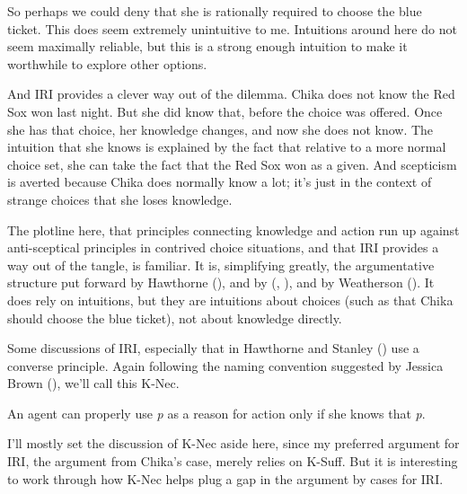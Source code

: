 \documentclass[
  10pt,
  letterpaper,
  DIV=11,
  numbers=noendperiod,
  twoside]{scrartcl}
\providecommand{\tightlist}{%
  \setlength{\itemsep}{0pt}\setlength{\parskip}{0pt}}\usepackage{longtable,booktabs,array}
\begin{document}
So perhaps we could deny that she is rationally required to choose the
blue ticket. This does seem extremely unintuitive to me. Intuitions
around here do not seem maximally reliable, but this is a strong enough
intuition to make it worthwhile to explore other options.

And IRI provides a clever way out of the dilemma. Chika does not know
the Red Sox won last night. But she did know that, before the choice was
offered. Once she has that choice, her knowledge changes, and now she
does not know. The intuition that she knows is explained by the fact
that relative to a more normal choice set, she can take the fact that
the Red Sox won as a given. And scepticism is averted because Chika does
normally know a lot; it's just in the context of strange choices that
she loses knowledge.

The plotline here, that principles connecting knowledge and action run
up against anti-sceptical principles in contrived choice situations, and
that IRI provides a way out of the tangle, is familiar. It is,
simplifying greatly, the argumentative structure put forward by
Hawthorne (), and by
(,
), and by Weatherson
(). It does rely on intuitions, but
they are intuitions about choices (such as that Chika should choose the
blue ticket), not about knowledge directly.

Some discussions of IRI, especially that in Hawthorne and Stanley
() use a converse principle.
Again following the naming convention suggested by Jessica Brown
(), we'll call this K-Nec.

\begin{description}
\tightlist
\item[K-Nec]
An agent can properly use \emph{p} as a reason for action only if she
knows that \emph{p}.
\end{description}

I'll mostly set the discussion of K-Nec aside here, since my preferred
argument for IRI, the argument from Chika's case, merely relies on
K-Suff. But it is interesting to work through how K-Nec helps plug a gap
in the argument by cases for IRI.
\end{document}
